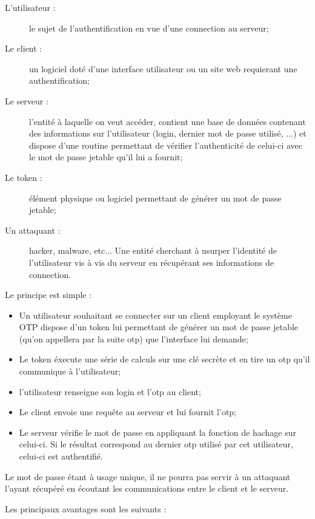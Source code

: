 \documentclass{../res/univ-projet}
\begin{document}
  \begin{description}
    \item[L'utilisateur :] le sujet de l'authentification en vue d'une connection au serveur;
    \item[Le client :] un logiciel doté d'une interface utilisateur ou un site web requierant une authentification;
    \item[Le serveur :] l'entité à laquelle on veut accéder, contient une base de données contenant des informations sur l'utilisateur (login, dernier mot de passe utilisé, ...) et dispose d'une routine permettant de vérifier l'authenticité de celui-ci avec le mot de passe jetable qu'il lui a fournit;
    \item[Le token :] élément physique ou logiciel permettant de générer un mot de passe jetable;
    \item[Un attaquant :] hacker, malware, etc... Une entité cherchant à usurper l'identité de l'utilisateur vis à vis du serveur en récupérant ses informations de connection.\\
  \end{description}

  Le principe est simple :

  \begin{itemize}
    \item Un utilisateur souhaitant se connecter sur un client employant le système OTP dispose d'un token lui permettant de générer un mot de passe jetable (qu'on appellera par la suite otp) que l'interface lui demande;
    \item Le token éxecute une série de calculs sur une clé secrète et en tire un otp qu'il communique à l'utilisateur;
    \item l'utilisateur renseigne son login et l'otp au client;
    \item Le client envoie une requ\^ete au serveur et lui fournit l'otp; 
    \item Le serveur vérifie le mot de passe en appliquant la fonction de hachage sur celui-ci. Si le résultat correspond au dernier otp utilisé par cet utilisateur, celui-ci est authentifié.\\
  \end{itemize}

  Le mot de passe étant à usage unique, il ne pourra pas servir à un attaquant l'ayant récupéré en écoutant les communications entre le client et le serveur.

  Les principaux avantages sont les suivants :
\end{document}
